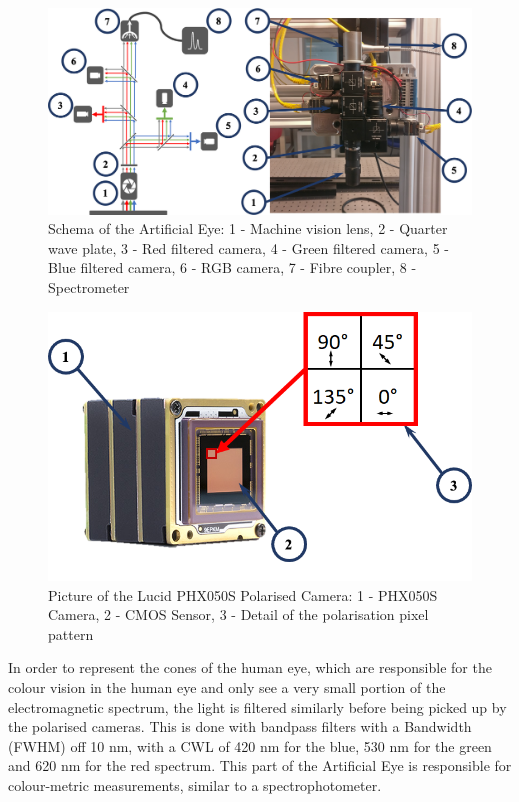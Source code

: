 \begin{figure}
\begin{center}
\includegraphics[width=12cm]{Pictures/AE_Setup}
\caption[Schema of the Artificial Eye]{Schema of the Artificial Eye: 1 - Machine vision lens, 2 - Quarter wave plate, 3 - Red filtered camera, 4 - Green filtered camera, 5 - Blue filtered camera, 6 - RGB camera, 7 - Fibre coupler, 8 - Spectrometer}
\label{AE_Setup}
\end{center}
\end{figure}

\begin{figure}
\begin{center}
\includegraphics[width=12cm]{Pictures/LucidPHX505s}
\caption[Picture of the Lucid PHX050S Polarised Camera]{Picture of the Lucid PHX050S Polarised Camera\cite{Labs}: 1 - PHX050S Camera, 2 - CMOS Sensor, 3 - Detail of the polarisation pixel pattern}
\label{PHX050S}
\end{center}
\end{figure}

In order to represent the cones of the human eye, which are responsible for the colour vision in the human eye and only see a very small portion of the electromagnetic spectrum, the light is filtered similarly before being picked up by the polarised cameras. This is done with bandpass filters with a Bandwidth (FWHM) off 10 nm, with a CWL of 420 nm for the blue, 530 nm for the green and 620 nm for the red spectrum. This part of the Artificial Eye is responsible for colour-metric measurements, similar to a spectrophotometer. 


